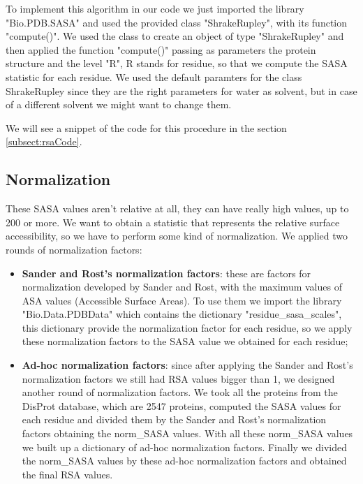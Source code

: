 To implement this algorithm in our code we just imported the library "Bio.PDB.SASA" and used the provided class "ShrakeRupley", with its function "compute()". We used the class to create an object of type "ShrakeRupley" and then applied the function "compute()" passing as parameters the protein structure and the level "R", R stands for residue, so that we compute the SASA statistic for each residue. We used the default paramters for the class ShrakeRupley since they are the right parameters for water as solvent, but in case of a different solvent we might want to change them.

We will see a snippet of the code for this procedure in the section \ref{subsect:rsaCode}.

\subsection{Normalization}

These SASA values aren't relative at all, they can have really high values, up to 200 or more. We want to obtain a statistic that represents the relative surface accessibility, so we have to perform some kind of normalization. We applied two rounds of normalization factors:

\begin{itemize}
    \item \textbf{Sander and Rost's normalization factors}: these are factors for normalization developed by Sander and Rost, with the maximum values of ASA values (Accessible Surface Areas). To use them we import the library "Bio.Data.PDBData" which contains the dictionary "residue\_sasa\_scales", this dictionary provide the normalization factor for each residue, so we apply these normalization factors to the SASA value we obtained for each residue;
    \item \textbf{Ad-hoc normalization factors}: since after applying the Sander and Rost's normalization factors we still had RSA values bigger than 1, we designed another round of normalization factors. We took all the proteins from the DisProt database, which are 2547 proteins, computed the SASA values for each residue and divided them by the Sander and Rost's normalization factors obtaining the norm\_SASA values. With all these norm\_SASA values we built up a dictionary of ad-hoc normalization factors. Finally we divided the norm\_SASA values by these ad-hoc normalization factors and obtained the final RSA values.
\end{itemize}

